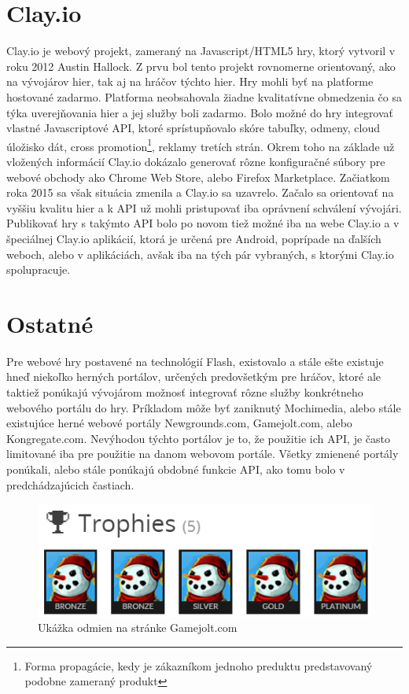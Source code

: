 \section{Clay.io}
Clay.io je webový projekt, zameraný na Javascript/HTML5 hry, ktorý vytvoril v roku 2012 Austin Hallock. Z prvu bol tento projekt rovnomerne orientovaný, ako na vývojárov hier, tak aj na hráčov týchto hier. Hry mohli byť na platforme hostované zadarmo. Platforma neobsahovala žiadne kvalitatívne obmedzenia čo sa týka uverejňovania hier a jej služby boli zadarmo. Bolo možné do hry integrovať vlastné Javascriptové API, ktoré sprístupňovalo skóre tabuľky, odmeny, cloud úložisko dát, cross promotion\footnote{Forma propagácie, kedy je zákazníkom jednoho preduktu predstavovaný podobne zameraný produkt}, reklamy tretích strán. Okrem toho na základe už vložených informácií Clay.io dokázalo generovať rôzne konfiguračné súbory pre webové obchody ako Chrome Web Store, alebo Firefox Marketplace. Začiatkom roka 2015 sa však situácia zmenila a Clay.io sa uzavrelo. Začalo sa orientovať na vyššiu kvalitu hier a k API už mohli pristupovať iba oprávnení schválení vývojári. Publikovať hry s takýmto API bolo po novom tiež možné iba na webe Clay.io a v špeciálnej Clay.io aplikácií, ktorá je určená pre Android, poprípade na ďalších weboch, alebo v aplikáciách, avšak iba na tých pár vybraných, s ktorými Clay.io spolupracuje. \cite{clayio}  

\section{Ostatné}
Pre webové hry postavené na technológií Flash, existovalo a stále ešte existuje hneď niekoľko herných portálov, určených predovšetkým pre hráčov, ktoré ale taktiež ponúkajú vývojárom možnosť integrovať rôzne služby konkrétneho webového portálu do hry. Príkladom môže byť zaniknutý Mochimedia, alebo stále existujúce herné webové portály Newgrounds.com, Gamejolt.com, alebo Kongregate.com. Nevýhodou týchto portálov je to, že použitie ich API, je často limitované iba pre použitie na danom webovom portále. Všetky zmienené portály ponúkali, alebo stále ponúkajú obdobné funkcie API, ako tomu bolo v predchádzajúcich častiach. 
\begin{figure}[h]
  \centering
  \includegraphics[scale=0.5]{fig/odmeny2.png}
  \caption{Ukážka odmien na stránke Gamejolt.com}
  \label{fig:odmeny}
\end{figure}

